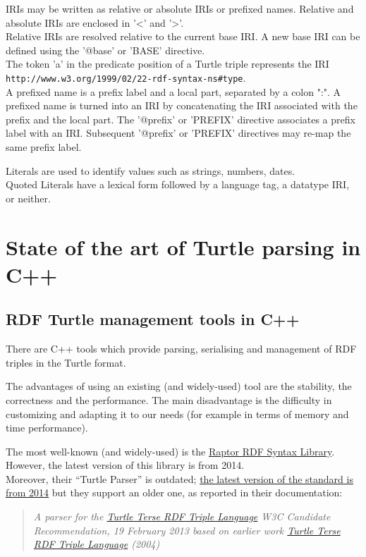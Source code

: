 \documentclass[oneside]{book}
\begin{document}
IRIs may be written as relative or absolute IRIs or prefixed names. Relative and absolute IRIs are enclosed in '<' and '>'.\\
Relative IRIs are resolved relative to the current base IRI. A new base IRI can be defined using the '@base' or 'BASE' directive.\\
The token 'a' in the predicate position of a Turtle triple represents the IRI\\
\verb|http://www.w3.org/1999/02/22-rdf-syntax-ns#type|.\\
A prefixed name is a prefix label and a local part, separated by a colon ":". A prefixed name is turned into an IRI by concatenating the IRI associated with the prefix and the local part. The '@prefix' or 'PREFIX' directive associates a prefix label with an IRI. Subsequent '@prefix' or 'PREFIX' directives may re-map the same prefix label.

Literals are used to identify values such as strings, numbers, dates.\\
Quoted Literals have a lexical form followed by a language tag, a datatype IRI, or neither.

\section{State of the art of Turtle parsing in C++}

\subsection{RDF Turtle management tools in C++}
There are C++ tools which provide parsing, serialising and management of RDF triples in the Turtle format.

The advantages of using an existing (and widely-used) tool are the stability, the correctness and the performance. The main disadvantage is the difficulty in customizing and adapting it to our needs (for example in terms of memory and time performance).

The most well-known (and widely-used) is the \href{http://librdf.org/raptor}{Raptor RDF Syntax Library}.\\
However, the latest version of this library is from 2014.\\
Moreover, their ``Turtle Parser'' is outdated; \href{https://www.w3.org/TR/turtle}{the latest version of the standard is from 2014} but they support an older one, as reported in their documentation:
\begin{quote}
\textit{A parser for the \href{http://www.w3.org/TR/2013/CR-turtle-20130219/}{Turtle Terse RDF Triple Language} W3C Candidate Recommendation, 19 February 2013 based on earlier work \href{http://www.dajobe.org/2004/01/turtle/}{Turtle Terse RDF Triple Language} (2004)}
\end{quote}
\end{document}
